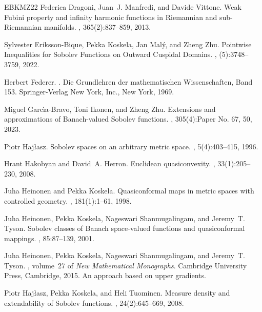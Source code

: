 \documentclass[reqno]{amsart}
\numberwithin{equation}{section}
\theoremstyle{remark}
\begin{document}
\begin{thebibliography}{EBKMZ22}
Federica Dragoni, Juan~J. Manfredi, and Davide Vittone.
\newblock Weak {F}ubini property and infinity harmonic functions in
  {R}iemannian and sub-{R}iemannian manifolds.
, 365(2):837--859, 2013.

Sylvester Eriksson-Bique, Pekka Koskela, Jan Mal\'{y}, and Zheng Zhu.
\newblock Pointwise {I}nequalities for {S}obolev {F}unctions on {O}utward
  {C}uspidal {D}omains.
, (5):3748--3759, 2022.

Herbert Federer.
.
\newblock Die Grundlehren der mathematischen Wissenschaften, Band 153.
  Springer-Verlag New York, Inc., New York, 1969.

Miguel Garc\'{\i}a-Bravo, Toni Ikonen, and Zheng Zhu.
\newblock Extensions and approximations of {B}anach-valued {S}obolev functions.
, 305(4):Paper No. 67, 50, 2023.

Piotr Haj{\l}asz.
\newblock Sobolev spaces on an arbitrary metric space.
, 5(4):403--415, 1996.

Hrant Hakobyan and David~A. Herron.
\newblock Euclidean quasiconvexity.
, 33(1):205--230, 2008.

Juha Heinonen and Pekka Koskela.
\newblock Quasiconformal maps in metric spaces with controlled geometry.
, 181(1):1--61, 1998.

Juha Heinonen, Pekka Koskela, Nageswari Shanmugalingam, and Jeremy~T. Tyson.
\newblock Sobolev classes of {B}anach space-valued functions and quasiconformal
  mappings.
, 85:87--139, 2001.

Juha Heinonen, Pekka Koskela, Nageswari Shanmugalingam, and Jeremy~T. Tyson.
, volume~27 of {\em New
  Mathematical Monographs}.
\newblock Cambridge University Press, Cambridge, 2015.
\newblock An approach based on upper gradients.

Piotr Haj\l{}asz, Pekka Koskela, and Heli Tuominen.
\newblock Measure density and extendability of {S}obolev functions.
, 24(2):645--669, 2008.


\end{thebibliography}
\end{document}
